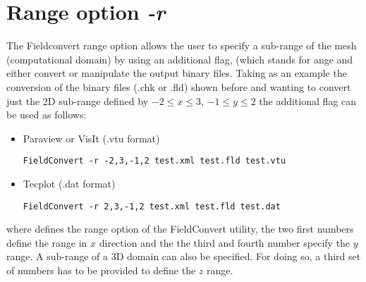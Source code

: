 \section{Range option \textit{-r}}
The Fieldconvert range option  allows the user to specify
a sub-range of the mesh (computational domain) by using an
additional flag,  (which stands for ange and either
convert or manipulate the \nekpp output binary files.
Taking as an example the conversion of the \nekpp binary files
(.chk or .fld) shown before and wanting to convert just the 2D
sub-range defined by $-2\leq x \leq 3$, $-1\leq y \leq 2$ the
additional flag  can be used as follows:
%
\begin{itemize}
\item Paraview or VisIt (.vtu format)
%
\begin{lstlisting}[style=BashInputStyle]
FieldConvert -r -2,3,-1,2 test.xml test.fld test.vtu
\end{lstlisting}
%
\item Tecplot (.dat format)
%
\begin{lstlisting}[style=BashInputStyle]
FieldConvert -r 2,3,-1,2 test.xml test.fld test.dat
\end{lstlisting}
%
\end{itemize}
where  defines the range option of the FieldConvert
utility, the two first numbers define the range in $x$ direction
and the the third and fourth number specify the $y$ range.
A sub-range of a 3D domain can also be specified.
For doing so, a third set of numbers has to be provided
to define the $z$ range.
%
%
%
